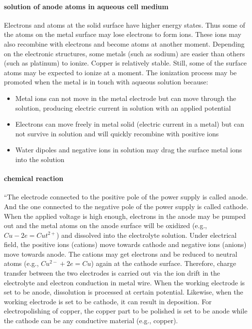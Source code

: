 \paragraph{solution of anode atoms in aqueous cell medium}
Electrons and atoms at the solid surface have higher energy states. Thus some of the atoms on the metal surface may lose electrons to form ions. These ions may also recombine with electrons and become atoms at another moment. Depending on the electronic structures, some metals (such as sodium) are easier than others (such as platinum) to ionize. Copper is relatively stable. Still, some of the surface atoms may be expected to ionize at a moment. The ionization process may be promoted when the metal is in touch with aqueous solution because: 
\begin{itemize}
	\item Metal ions can not move in the metal electrode but can move through the solution, producing electric current in solution with an applied potential
	\item Electrons can move freely in metal solid (electric current in a metal) but can not survive in solution and will quickly recombine with positive ions
	\item Water dipoles and negative ions in solution may drag the surface metal ions into the solution
\end{itemize}

\paragraph{chemical reaction}
``The electrode connected to the positive pole of the power supply is called anode. And the one connected to the negative pole of the power supply is called cathode. When the applied voltage is high enough, electrons in the anode may be pumped out and the metal atoms on the anode surface will be oxidized (e.g., $Cu - 2e = Cut^{2+}$) and dissolved into the electrolyte solution. Under electrical field, the positive ions (cations) move towards cathode and negative ions (anions) move towards anode. The cations may get electrons and be reduced to neutral atoms (e.g., $Cu^{2-} + 2e = Cu$) again at the cathode surface. Therefore, charge transfer between the two electrodes is carried out via the ion drift in the electrolyte and electron conduction in metal wire. When the working electrode is set to be anode, dissolution is processed at certain potential. Likewise, when the working electrode is set to be cathode, it can result in deposition. For electropolishing of copper, the copper part to be polished is set to be anode while the cathode can be any conductive material (e.g., copper).

